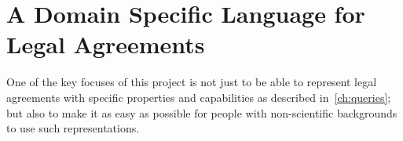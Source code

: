 \chapter{A Domain Specific Language for Legal Agreements}\label{ch:lang}

One of the key focuses of this project is not just to be able to represent legal agreements with specific properties and capabilities as described in~\autoref{ch:queries};
but also to make it as easy as possible for people with non-scientific backgrounds to use such representations.
